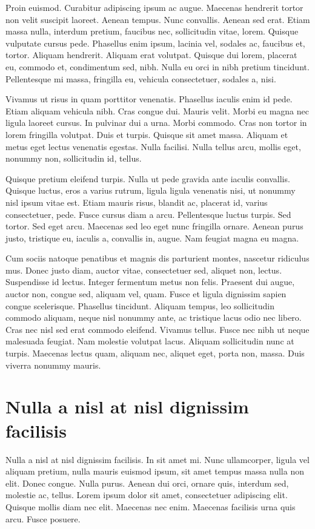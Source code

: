 \documentclass[printmode,mgr,pl]{mgr}
\begin{document}
Proin euismod. Curabitur adipiscing ipsum ac augue. Maecenas hendrerit
tortor non velit suscipit laoreet. Aenean tempus. Nunc
convallis. Aenean sed erat. Etiam massa nulla, interdum pretium,
faucibus nec, sollicitudin vitae, lorem. Quisque vulputate cursus
pede. Phasellus enim ipsum, lacinia vel, sodales ac, faucibus et,
tortor. Aliquam hendrerit. Aliquam erat volutpat. Quisque dui lorem,
placerat eu, commodo et, condimentum sed, nibh. Nulla eu orci in nibh
pretium tincidunt. Pellentesque mi massa, fringilla eu, vehicula
consectetuer, sodales a, nisi.

Vivamus ut risus in quam porttitor venenatis. Phasellus iaculis enim
id pede. Etiam aliquam vehicula nibh. Cras congue dui. Mauris
velit. Morbi eu magna nec ligula laoreet cursus. In pulvinar dui a
urna. Morbi commodo. Cras non tortor in lorem fringilla volutpat. Duis
et turpis. Quisque sit amet massa. Aliquam et metus eget lectus
venenatis egestas. Nulla facilisi. Nulla tellus arcu, mollis eget,
nonummy non, sollicitudin id, tellus.

Quisque pretium eleifend turpis. Nulla ut pede gravida ante iaculis
convallis. Quisque luctus, eros a varius rutrum, ligula ligula
venenatis nisi, ut nonummy nisl ipsum vitae est. Etiam mauris risus,
blandit ac, placerat id, varius consectetuer, pede. Fusce cursus diam
a arcu. Pellentesque luctus turpis. Sed tortor. Sed eget
arcu. Maecenas sed leo eget nunc fringilla ornare. Aenean purus justo,
tristique eu, iaculis a, convallis in, augue. Nam feugiat magna eu
magna.

Cum sociis natoque penatibus et magnis dis parturient montes, nascetur
ridiculus mus. Donec justo diam, auctor vitae, consectetuer sed,
aliquet non, lectus. Suspendisse id lectus. Integer fermentum metus
non felis. Praesent dui augue, auctor non, congue sed, aliquam vel,
quam. Fusce et ligula dignissim sapien congue scelerisque. Phasellus
tincidunt. Aliquam tempus, leo sollicitudin commodo aliquam, neque
nisl nonummy ante, ac tristique lacus odio nec libero. Cras nec nisl
sed erat commodo eleifend. Vivamus tellus. Fusce nec nibh ut neque
malesuada feugiat. Nam molestie volutpat lacus. Aliquam sollicitudin
nunc at turpis. Maecenas lectus quam, aliquam nec, aliquet eget, porta
non, massa. Duis viverra nonummy mauris.


\chapter{Nulla a nisl at nisl dignissim facilisis}
Nulla a nisl at nisl dignissim facilisis. In sit amet mi. Nunc
ullamcorper, ligula vel aliquam pretium, nulla mauris euismod ipsum,
sit amet tempus massa nulla non elit. Donec congue. Nulla
purus. Aenean dui orci, ornare quis, interdum sed, molestie ac,
tellus. Lorem ipsum dolor sit amet, consectetuer adipiscing
elit. Quisque mollis diam nec elit. Maecenas nec enim. Maecenas
facilisis urna quis arcu. Fusce posuere.
\end{document}

